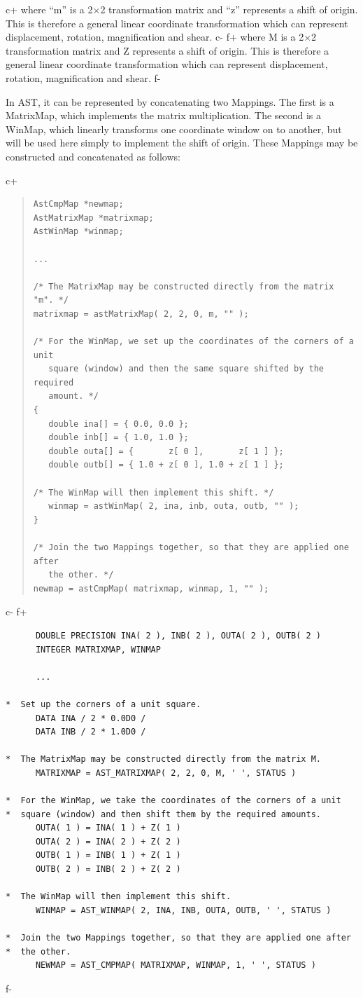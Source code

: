 \documentclass[twoside,11pt]{article}
\begin{document}
c+
where ``m'' is a 2$\times$2 transformation matrix and ``z'' represents
a shift of origin. This is therefore a general linear coordinate
transformation which can represent displacement, rotation,
magnification and shear.
c-
f+
where M is a 2$\times$2 transformation matrix and Z represents a shift
of origin. This is therefore a general linear coordinate
transformation which can represent displacement, rotation,
magnification and shear.
f-

In AST, it can be represented by concatenating two Mappings. The first
is a MatrixMap, which implements the matrix multiplication. The second
is a WinMap, which linearly transforms one coordinate window on to
another, but will be used here simply to implement the shift of
origin. These Mappings may be constructed and concatenated as follows:

c+
\begin{quote}
\small
\begin{verbatim}
AstCmpMap *newmap;
AstMatrixMap *matrixmap;
AstWinMap *winmap;

...

/* The MatrixMap may be constructed directly from the matrix "m". */
matrixmap = astMatrixMap( 2, 2, 0, m, "" );

/* For the WinMap, we set up the coordinates of the corners of a unit
   square (window) and then the same square shifted by the required
   amount. */
{
   double ina[] = { 0.0, 0.0 };
   double inb[] = { 1.0, 1.0 };
   double outa[] = {       z[ 0 ],       z[ 1 ] };
   double outb[] = { 1.0 + z[ 0 ], 1.0 + z[ 1 ] };

/* The WinMap will then implement this shift. */
   winmap = astWinMap( 2, ina, inb, outa, outb, "" );
}

/* Join the two Mappings together, so that they are applied one after
   the other. */
newmap = astCmpMap( matrixmap, winmap, 1, "" );
\end{verbatim}
\normalsize
\end{quote}
c-
f+
\small
\begin{verbatim}
      DOUBLE PRECISION INA( 2 ), INB( 2 ), OUTA( 2 ), OUTB( 2 )
      INTEGER MATRIXMAP, WINMAP

      ...

*  Set up the corners of a unit square.
      DATA INA / 2 * 0.0D0 /
      DATA INB / 2 * 1.0D0 /

*  The MatrixMap may be constructed directly from the matrix M.
      MATRIXMAP = AST_MATRIXMAP( 2, 2, 0, M, ' ', STATUS )

*  For the WinMap, we take the coordinates of the corners of a unit
*  square (window) and then shift them by the required amounts.
      OUTA( 1 ) = INA( 1 ) + Z( 1 )
      OUTA( 2 ) = INA( 2 ) + Z( 2 )
      OUTB( 1 ) = INB( 1 ) + Z( 1 )
      OUTB( 2 ) = INB( 2 ) + Z( 2 )

*  The WinMap will then implement this shift.
      WINMAP = AST_WINMAP( 2, INA, INB, OUTA, OUTB, ' ', STATUS )

*  Join the two Mappings together, so that they are applied one after
*  the other.
      NEWMAP = AST_CMPMAP( MATRIXMAP, WINMAP, 1, ' ', STATUS )
\end{verbatim}
\normalsize
f-
\end{document}
